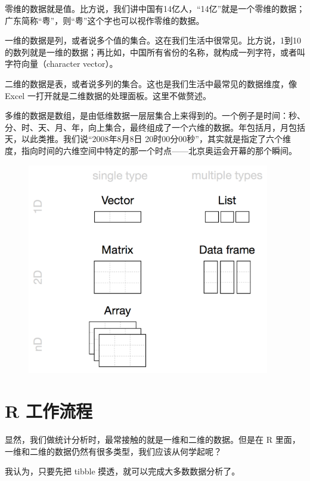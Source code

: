 \documentclass[
  letterpaper,
]{ctexbook}
\begin{document}
零维的数据就是值。比方说，我们讲中国有14亿人，``14亿''就是一个零维的数据；广东简称``粤''，则``粤''这个字也可以视作零维的数据。

一维的数据是列，或者说多个值的集合。这在我们生活中很常见。比方说，1到10的数列就是一维的数据；再比如，中国所有省份的名称，就构成一列字符，或者叫字符向量（character
vector）。

二维的数据是表，或者说多列的集合。这也是我们生活中最常见的数据维度，像
Excel 一打开就是二维数据的处理面板。这里不做赘述。

多维的数据是数组，是由低维数据一层层集合上来得到的。一个例子是时间：秒、分、时、天、月、年，向上集合，最终组成了一个六维的数据。年包括月，月包括天，以此类推。我们说``2008年8月8日
20时00分00秒''，其实就是指定了六个维度，指向时间的六维空间中特定的那一个时点------北京奥运会开幕的那个瞬间。

\begin{figure}

{\centering \includegraphics[width=4.16667in,height=\textheight]{fig/types.png}

}

\end{figure}

\hypertarget{r-ux5de5ux4f5cux6d41ux7a0b}{%
\section{R 工作流程}\label{r-ux5de5ux4f5cux6d41ux7a0b}}

显然，我们做统计分析时，最常接触的就是一维和二维的数据。但是在 R
里面，一维和二维的数据仍然有很多类型，我们应该从何学起呢？

我认为，只要先把 tibble 摸透，就可以完成大多数数据分析了。
\end{document}
